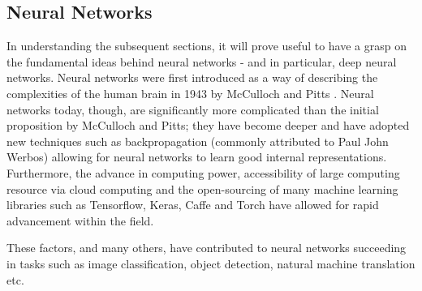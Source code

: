 \subsection{Neural Networks}
In understanding the subsequent sections, it will prove useful to have a grasp on the fundamental ideas behind neural networks - and in particular, deep neural networks. 
Neural networks were first introduced as a way of describing the complexities of the human brain in 1943 by McCulloch and Pitts \autocite{pitts}.
\newline
Neural networks today, though, are significantly more complicated than the initial proposition by McCulloch and Pitts; they have become deeper and have adopted new techniques such as backpropagation (commonly attributed to Paul John Werbos) allowing for neural networks to learn good internal representations. 
Furthermore, the advance in computing power, accessibility of large computing resource via cloud computing and the open-sourcing of many machine learning libraries such as Tensorflow, Keras, Caffe and Torch have allowed for rapid advancement within the field.

These factors, and many others, have contributed to neural networks succeeding in tasks such as image classification, object detection, natural machine translation etc. 
